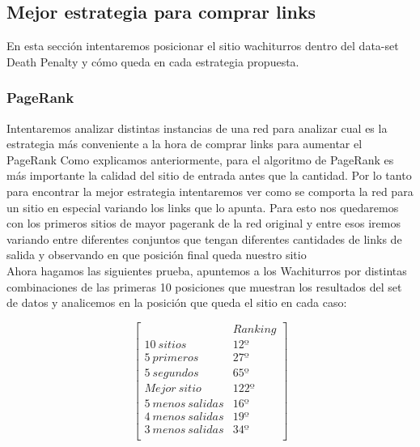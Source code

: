 
\subsection{Mejor estrategia para comprar links}

En esta sección intentaremos posicionar el sitio wachiturros dentro del data-set Death Penalty y cómo queda en cada 
estrategia propuesta.

\subsubsection{PageRank}

Intentaremos analizar distintas instancias de una red para analizar cual es la estrategia más conveniente a la hora de comprar links para aumentar el PageRank 
Como explicamos anteriormente, para el algoritmo de PageRank es más importante la calidad del sitio de entrada antes que la cantidad. Por lo tanto para encontrar la mejor estrategia intentaremos ver como se comporta la red para un sitio en especial variando los links que lo apunta. Para esto nos quedaremos con los primeros sitios de mayor pagerank de la red original y entre esos iremos variando entre diferentes conjuntos que tengan diferentes cantidades de links de salida y observando en que posición final queda nuestro sitio \\

Ahora hagamos las siguientes prueba, apuntemos a los Wachiturros por distintas combinaciones de las primeras 10 posiciones que muestran los resultados del set de datos y analicemos en la posición que queda el sitio en cada caso:

   $$ 
\begin{bmatrix}
              		&      Ranking \\
 10\ sitios 		&   	12º        \\
 5\ primeros   		&     	27º   \\
 5\ segundos   		&      	65º 	\\
 Mejor\ sitio   		&        122º    \\
 5\ menos\ salidas  	&        16º     \\
 4\ menos\ salidas  	&        19º  \\
 3\ menos\ salidas   	&     	34º \\
\end{bmatrix} 
$$

